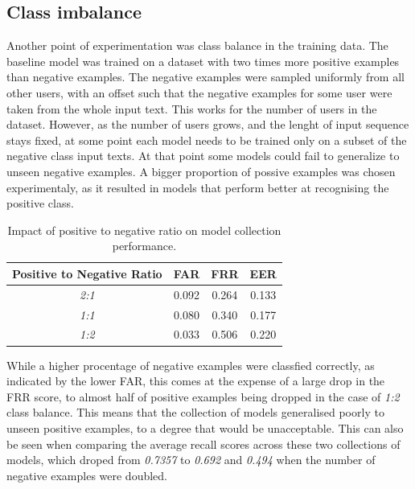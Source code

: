 \subsection{Class imbalance}
Another point of experimentation was class balance in the training data. The baseline model was trained on a dataset with two times more positive examples than negative examples. The negative examples were sampled uniformly from all other users, with an offset such that the negative examples for some user were taken from the whole input text. This works for the number of users in the dataset. However, as the number of users grows, and the lenght of input sequence stays fixed, at some point each model needs to be trained only on a subset of the negative class input texts. At that point some models could fail to generalize to unseen negative examples. 
A bigger proportion of possive examples was chosen experimentaly, as it resulted in models that perform better at recognising the positive class.

\begin{center}
	\begin{table}[H]
		\begin{center}
			\begin{tabular}{ |c|c|c|c| } 
				\hline
				Positive to Negative Ratio & FAR & FRR & EER \\
				\hline
				\textit{2:1} & 0.092 & 0.264 & 0.133 \\
				\hline
				\textit{1:1} & 0.080 & 0.340 & 0.177 \\
				\hline
				\textit{1:2} & 0.033 & 0.506 & 0.220 \\
				\hline
			\end{tabular}
		\end{center}
		\caption{Impact of positive to negative ratio on model collection performance.}
		\label{table:egde_encoding_comp}
	\end{table}
\end{center}

While a higher procentage of negative examples were classfied correctly, as indicated by the lower FAR, this comes at the expense of a large drop in the FRR score, to almost half of positive examples being dropped in the case of \textit{1:2} class balance. This means that the collection of models generalised poorly to unseen positive examples, to a degree that would be unacceptable. This can also be seen when comparing the average recall scores across these two collections of models, which droped from \textit{0.7357} to \textit{0.692} and \textit{0.494} when the number of negative examples were doubled. 
 
